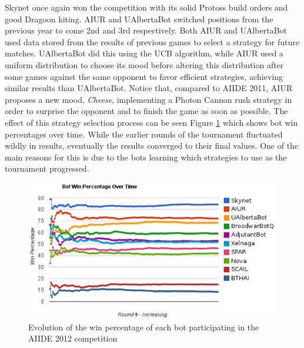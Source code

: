\documentclass[journal]{IEEEtran}
\begin{document}
Skynet once  again won  the competition with  its solid  Protoss build
orders  and  good  Dragoon  kiting.   AIUR  and  UAlbertaBot  switched
positions from  the previous  year to come  2nd and  3rd respectively.
Both  AIUR  and UAlbertaBot  used  data  stored  from the  results  of
previous games  to select a strategy for  future matches.  UAlbertaBot
did  this  using  the  UCB  \cite{auer2002finite} algorithm,  while  AIUR  used  a  uniform
distribution  to choose  its  mood before  altering this  distribution
after  some  games  against  the  same  opponent  to  favor  efficient
strategies, achieving  similar results than  UAlbertaBot. Notice that,
compared  to AIIDE 2011,  AIUR proposes  a new  mood, \textit{Cheese},
implementing a  Photon Cannon rush  strategy in order to  surprise the
opponent and  to finish the game  as soon as possible.   The effect of
this strategy selection process can be seen Figure \ref{fig:aiide2012}
which shows bot  win percentages over time.  While  the earlier rounds
of the tournament fluctuated wildly in results, eventually the results
converged to their  final values. One of the main  reasons for this is
due to  the bots  learning which strategies  to use as  the tournament
progressed.

\begin{figure}[t!]
    \centering
    \includegraphics[width=\columnwidth]{figures/aiide2012_v2}
    \caption{Evolution of the win percentage of each bot participating in the AIIDE 2012 competition}
    \label{fig:aiide2012}
\end{figure}
\end{document}
